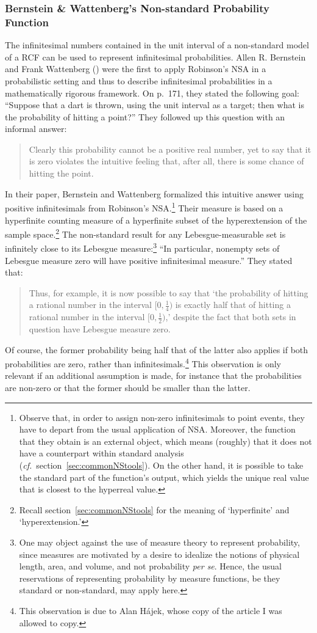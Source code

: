 \subsubsection*{Bernstein \& Wattenberg's Non-standard Probability Function}
The infinitesimal numbers contained in the unit interval of a non-standard model of a RCF can be used to represent infinitesimal probabilities. Allen R. Bernstein and Frank Wattenberg () were the first to apply Robinson's NSA in a probabilistic setting and thus to describe infinitesimal probabilities in a mathematically rigorous framework. On p.~171, they stated the following goal: ``Suppose that a dart is thrown, using the unit interval as a target; then what is the probability of hitting a point?'' They followed up this question with an informal answer:
\begin{quote}
Clearly this probability cannot be a positive real number, yet to say that it is zero violates the intuitive feeling that, after all, there is some chance of hitting the point.
\end{quote}
In their paper, Bernstein and Wattenberg formalized this intuitive answer using positive infinitesimals from Robinson's NSA.\footnote{Observe that, in order to assign non-zero infinitesimals to point events, they have to depart from the usual application of NSA. Moreover, the function that they obtain is an external object, which means (roughly) that it does not have a counterpart within standard analysis (\textit{cf.}\ section~\ref{sec:commonNStools}). On the other hand, it is possible to take the standard part of the function's output, which yields the unique real value that is closest to the hyperreal value.}
Their measure is based on a hyperfinite counting measure of a hyperfinite subset of the hyperextension of the sample space.\footnote{Recall section~\ref{sec:commonNStools} for the meaning of `hyperfinite' and `hyperextension.'}
The non-standard result for any Lebesgue-measurable set is infinitely close to its Lebesgue measure:\footnote{One may object against the use of measure theory to represent probability, since measures are motivated by a desire to idealize the notions of physical length, area, and volume, and not probability \textit{per se}. Hence, the usual reservations of representing probability by measure functions, be they standard or non-standard, may apply here.} ``In particular, nonempty sets of Lebesgue measure zero will have positive infinitesimal measure.''
They stated that:
\begin{quote}
Thus, for example, it is now possible to say that `the probability of hitting a rational number in the interval $[0,\frac{1}{4})$ is exactly half that of hitting a rational number in the interval  $[0, \frac{1}{2})$,' despite the fact that both sets in question have Lebesgue measure zero.
\end{quote}
Of course, the former probability being half that of the latter also applies if both probabilities are zero, rather than infinitesimals.\footnote{This observation is due to Alan H\'{a}jek, whose copy of the article I was allowed to copy.} This observation is only relevant if an additional assumption is made, for instance that the probabilities are non-zero or that the former should be smaller than the latter.

